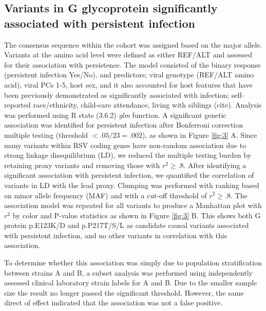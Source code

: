 \documentclass{article}
\begin{document}
\subsection{Variants in G glycoprotein significantly associated with persistent infection}
The consensus sequence within the cohort was assigned based on the major allele.
Variants at the amino acid level were defined as either REF/ALT and assessed for their association with persistence.
The model consisted of
the binary response (persistent infection Yes/No),
and predictors; viral genotype (REF/ALT amino acid), viral PCs 1-5, host sex, and it also accounted for host features that have been previously demonstrated as significantly associated with infection;
self-reported race/ethnicity, child-care attendance, living with siblings (cite).
Analysis was performed using R stats (3.6.2) \textit{glm} function. 
A significant genetic association was identified for persistent infection after Bonferroni correction multiple testing (threshold $<.05/23=.002$), 
as shown in 
Figure \ref{fig:3} A. 
Since many variants within RSV coding genes have non-random association due to strong linkage disequilibrium (LD), 
we reduced the multiple testing burden by retaining proxy variants and removing those with
$r^2 \ge .8$.
After identifying a significant association with persistent infection,
we quantified the correlation of variants in LD with the lead proxy.
Clumping was performed with ranking based on minor allele frequency (MAF) and with a cut-off threshold of $r^2 \ge .8$.
The association model was repeated for all variants to produce a Manhattan plot with $r^2$ by color and P-value statistics as shown in 
Figure \ref{fig:3} B.
This shows both G protein 
p.E123K/D and 
p.P217T/S/L as candidate causal variants associated with persistent infection, and no other variants in correlation with this association. 

To determine whether this association was simply due to population stratification between strains A and B, a subset analysis was performed using independently assessed clinical laboratory strain labels for A and B.
Due to the smaller sample size the result no longer passed the significant threshold. 
However, the same direct of effect indicated that the association was not a false positive. 
\end{document}
